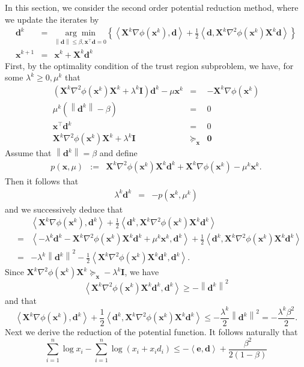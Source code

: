 \documentclass{article}
\newcommand{\assign}{:=}
\newcommand{\x}{\mathbf{x}}
\newcommand{\0}{\textbf{0}}
\newcommand{\e}{\mathbf{e}}
\newcommand{\n}{\nabla}
\newcommand{\X}{\mathbf{X}}
\newcommand{\I}{\mathbf{I}}
\newcommand{\tmd}{\mathbf{d}}
\begin{document}
In this section, we consider the second order potential reduction method,
where we update the iterates by
\begin{eqnarray*}
  \tmd^k & = & \underset{\left\| \tmd \right\| \leq \beta, \x^{\top} \tmd =
  0}{\arg \min}  \left\{ \left\langle \X^k \n \phi \left( \x^k \right), \tmd
  \right\rangle + \frac{1}{2} \left\langle \tmd, \X^k \nabla^2 \phi \left(
  \x^k \right) \X^k \tmd \right\rangle \right\}\\
  \x^{k + 1} & = & \x^k + \X^k \tmd^k
\end{eqnarray*}
First, by the optimality condition of the trust region subproblem, we have,
for some $\lambda^k \geq 0, \mu^k$ that
\begin{eqnarray*}
  \left( \X^k \nabla^2 \phi \left( \x^k \right) \X^k + \lambda^k \I \right)
  \tmd^k - \mu \x^k & = & - \X^k \n \phi \left( \x^k \right)\\
  \mu^k \left( \left\| \tmd^k \right\| - \beta \right) & = & 0\\
  \x^{\top} \tmd^k & = & 0\\
  \X^k \nabla^2 \phi \left( \x^k \right) \X^k + \lambda^k \I & \succeq_{\x} &
  \0
\end{eqnarray*}
Assume that $\left\| \tmd^k \right\| = \beta$ and define
\begin{eqnarray*}
  p \left( \x, \mu \right) & \assign & \X^k \nabla^2 \phi \left( \x^k \right)
  \X^k \tmd^k + \X^k \n \phi \left( \x^k \right) - \mu^k \x^k .
\end{eqnarray*}
Then it follows that
\begin{eqnarray*}
  \lambda^k \tmd^k & = & - p \left( \x^k, \mu^k \right)
\end{eqnarray*}
and we successively deduce that
\begin{eqnarray*}
  &  & \left\langle \X^k \n \phi \left( \x^k \right), \tmd^k \right\rangle +
  \frac{1}{2} \left\langle \tmd^k, \X^k \nabla^2 \phi \left( \x^k \right) \X^k
  \tmd^k \right\rangle\\
  & = & \left\langle - \lambda^k \tmd^k - \X^k \nabla^2 \phi \left( \x^k
  \right) \X^k \tmd^k + \mu^k \x^k, \tmd^k \right\rangle + \frac{1}{2}
  \left\langle \tmd^k, \X^k \nabla^2 \phi \left( \x^k \right) \X^k \tmd^k
  \right\rangle\\
  & = & - \lambda^k \left\| \tmd^k \right\|^2 - \frac{1}{2} \left\langle \X^k
  \nabla^2 \phi \left( \x^k \right) \X^k \tmd^k, \tmd^k \right\rangle .
\end{eqnarray*}
Since $\X^k \nabla^2 \phi \left( \x^k \right) \X^k \succeq_{\x} - \lambda^k
\I$, we have
\[ \left\langle \X^k \nabla^2 \phi \left( \x^k \right) \X^k \tmd^k, \tmd^k
   \right\rangle \geq - \left\| \tmd^k \right\|^2 \]
and that
\[ \left\langle \X^k \n \phi \left( \x^k \right), \tmd^k \right\rangle +
   \frac{1}{2} \left\langle \tmd^k, \X^k \nabla^2 \phi \left( \x^k \right)
   \X^k \tmd^k \right\rangle \leq - \frac{\lambda^k}{2} \left\| \tmd^k
   \right\|^2 = - \frac{\lambda^k \beta^2}{2} . \]
Next we derive the reduction of the potential function. It follows naturally
that
\[ \sum_{i = 1}^n \log x_i - \sum_{i = 1}^n \log (x_i + x_i d_i) \leq -
   \left\langle \e, \tmd \right\rangle + \frac{\beta^2}{2 (1 - \beta)} \]
\end{document}
